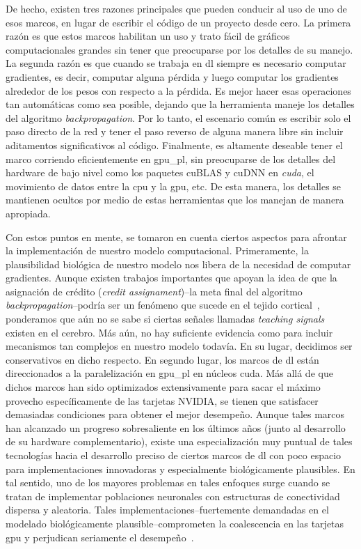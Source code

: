 {De hecho, existen tres razones principales que pueden conducir al uso de uno de esos marcos, en lugar de escribir el código de un proyecto desde cero.
La primera razón es que estos marcos habilitan un uso y trato fácil de gráficos computacionales grandes sin tener que preocuparse por los detalles de su manejo.
La segunda razón es que cuando se trabaja en \gls{dl} siempre es necesario computar gradientes, es decir, computar alguna pérdida y luego computar los gradientes alrededor de los pesos con respecto a la pérdida.
Es mejor hacer esas operaciones tan automáticas como sea posible, dejando que la herramienta maneje los detalles del algoritmo \emph{backpropagation}.
Por lo tanto, el escenario común es escribir solo el paso directo de la red y tener el paso reverso de alguna manera libre sin incluir aditamentos significativos al código.
Finalmente, es altamente deseable tener el marco corriendo eficientemente en  \gls{gpu_pl}, sin preocuparse de los detalles del hardware de bajo nivel como los paquetes cuBLAS y cuDNN en \emph{\gls{cuda}}, el movimiento de datos entre la \gls{cpu} y la \gls{gpu}, etc.
De esta manera, los detalles se mantienen ocultos por medio de estas herramientas que los manejan de manera apropiada.

Con estos puntos en mente, se tomaron en cuenta ciertos aspectos para afrontar la implementación de nuestro modelo computacional.
Primeramente, la plausibilidad biológica de  nuestro modelo nos libera de la necesidad de computar gradientes.
Aunque existen trabajos importantes que apoyan la idea de que la asignación de crédito (\emph{credit assignament})--la meta final del algoritmo \emph{backpropagation}--podría ser un fenómeno que sucede en el tejido cortical~\cite{Guerguiev2017TowardsDL}, ponderamos que aún no se sabe si ciertas señales llamadas \emph{teaching signals} existen en el cerebro.
Más aún, no hay suficiente evidencia como para incluir mecanismos tan complejos en nuestro modelo todavía.
En su lugar, decidimos ser conservativos en dicho respecto.
En segundo lugar, los marcos de \gls{dl} están direccionados a la paralelización en \gls{gpu_pl} en núcleos \gls{cuda}.
Más allá de que dichos marcos han sido optimizados extensivamente para sacar el máximo provecho específicamente de las tarjetas NVIDIA, se tienen que satisfacer demasiadas condiciones para obtener el mejor desempeño.
Aunque tales marcos han alcanzado un progreso sobresaliente en los últimos años (junto al desarrollo de su hardware complementario), existe una especialización muy puntual de tales tecnologías hacia el desarrollo preciso de ciertos marcos de \gls{dl} con poco espacio para implementaciones innovadoras y especialmente biológicamente plausibles.
En tal sentido, uno de los mayores problemas en tales enfoques surge cuando se tratan de implementar poblaciones neuronales con estructuras de conectividad dispersa y aleatoria.
Tales implementaciones--fuertemente demandadas en el modelado biológicamente plausible--comprometen la coalescencia en las tarjetas \gls{gpu} y perjudican seriamente el desempeño~\cite{doi:10.3109/0954898X.2012.739292}.

}
